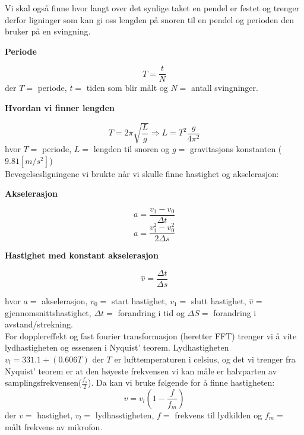 \documentclass[norsk,a4paper,12pt]{article}
\begin{document}
Vi skal også finne hvor langt over det synlige taket en pendel er festet og trenger derfor ligninger som kan gi oss lengden på snoren til en pendel og perioden den bruker på en svingning.\\
\begin{center}
\textbf{Periode}
\end{center}
\begin{equation}
T = \frac{t}{N}
\label{tid}
\end{equation}
der $T=$ periode, $t=$ tiden som blir målt og $N=$ antall svingninger.

\begin{center}
\textbf{Hvordan vi finner lengden}
\end{center}
\begin{equation}
T = 2\pi\sqrt{\frac{L}{g}} \Rightarrow L = T^2\frac{g}{4\pi^2}
\label{pendel}
\end{equation}
hvor $T=$ periode, $L=$ lengden til snoren og $g=$ gravitasjons konstanten ($9.81[m/s^2]$)\\


Bevegelsesligningene vi brukte når vi skulle finne hastighet og akselerasjon:
\begin{center}
\textbf{Akselerasjon}
\end{center}
\begin{equation}
a = \frac{v_1-v_0}{\Delta t}
\label{a1}
\end{equation}
\begin{equation}
a = \frac{v_1^2-v_0^2}{2\Delta s}
\label{a2}
\end{equation}
\begin{center}
\textbf{Hastighet med konstant akselerasjon}
\end{center}
\begin{equation}
\overset{-}{v} = \frac{\Delta t}{\Delta s}
\label{hastighet}
\end{equation}

hvor $a=$ akselerasjon, $v_0=$ start hastighet, $v_1=$ slutt hastighet, $\overset{-}{v}=$ gjennomsnittshastighet, $\Delta t=$ forandring i tid og $\Delta S=$ forandring i avstand/strekning.\\

For dopplereffekt og fast fourier transformasjon (heretter FFT) trenger vi å vite lydhastigheten og essensen i Nyquist' teorem. Lydhastigheten $v_l = 331.1+(0.606T)$ der $T$ er lufttemperaturen i celsius, og det vi trenger fra Nyquist' teorem er at den høyeste frekvensen vi kan måle er halvparten av samplingsfrekvensen($\frac{f_s}{2}$). Da kan vi bruke følgende for å finne hastigheten:
\begin{equation}
v = v_l\left( 1 - \frac{f}{f_m}\right)
\label{doppler}
\end{equation}
der $v=$ hastighet, $v_l =$ lydhasstigheten, $f=$ frekvens til lydkilden og $f_m=$ målt frekvens av mikrofon.
\end{document}
